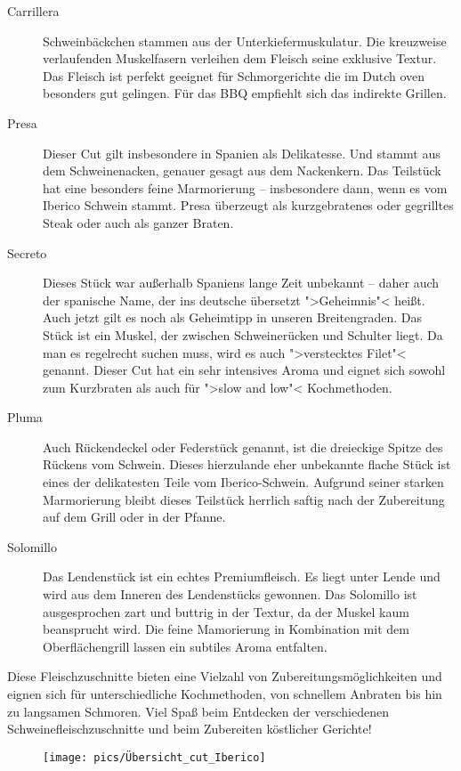 \begin{description}
	\item[Carrillera] Schweinbäckchen stammen aus der Unterkiefermuskulatur. Die kreuzweise verlaufenden Muskelfasern verleihen dem 
	Fleisch seine exklusive Textur. Das Fleisch ist perfekt geeignet für Schmorgerichte die im Dutch oven besonders gut gelingen. Für das 
	BBQ empfiehlt sich das indirekte Grillen.
	
	\item [Presa] Dieser Cut gilt insbesondere in Spanien als Delikatesse. Und 
	stammt aus dem Schweinenacken, genauer gesagt aus dem 
	Nackenkern. Das Teilstück hat eine besonders feine Marmorierung – 
	insbesondere dann, wenn es vom Iberico Schwein stammt. Presa überzeugt 
	als kurzgebratenes oder gegrilltes Steak oder auch als ganzer Braten.
	
	\item [Secreto] Dieses Stück war außerhalb Spaniens lange Zeit unbekannt 
	– daher auch der spanische Name, der ins deutsche übersetzt ">Geheimnis"< heißt. Auch jetzt gilt es noch 
	als Geheimtipp in unseren Breitengraden. Das Stück ist ein Muskel, der zwischen 
	Schweinerücken und Schulter liegt. Da man es regelrecht suchen muss, wird 
	es auch ">verstecktes Filet"< genannt. Dieser Cut hat ein sehr intensives 
	Aroma und eignet sich sowohl zum Kurzbraten als auch für ">slow and low"< 
	Kochmethoden.
	
	\item[Pluma] Auch Rückendeckel oder Federstück genannt, ist die dreieckige Spitze des Rückens vom 
	Schwein. Dieses hierzulande eher unbekannte flache Stück ist eines der delikatesten Teile vom 
	Iberico-Schwein. Aufgrund seiner starken Marmorierung bleibt dieses Teilstück herrlich saftig nach der 
	Zubereitung auf dem Grill oder in der Pfanne.
	
	\item[Solomillo] Das Lendenstück ist ein echtes Premiumfleisch. Es liegt unter Lende und wird aus dem Inneren des Lendenstücks 
	gewonnen. Das Solomillo ist ausgesprochen zart und buttrig in der Textur, da der Muskel kaum beansprucht wird. Die feine 
	Mamorierung in Kombination mit dem Oberflächengrill lassen ein subtiles Aroma entfalten.
\end{description}

Diese Fleischzuschnitte bieten eine Vielzahl von Zubereitungsmöglichkeiten 
und eignen sich für unterschiedliche Kochmethoden, von schnellem Anbraten 
bis hin zu langsamen Schmoren. Viel Spaß beim Entdecken der verschiedenen 
Schweinefleischzuschnitte und beim Zubereiten köstlicher Gerichte! 
\newpage
\begin{figure}[htbp]
	\centering
	\begin{minipage}{1\textwidth}
		\centering
		\texttt{[image: pics/Übersicht\_cut\_Iberico]}
		\label{fig:Übersicht3}
	\end{minipage}
\end{figure}
\newpage

